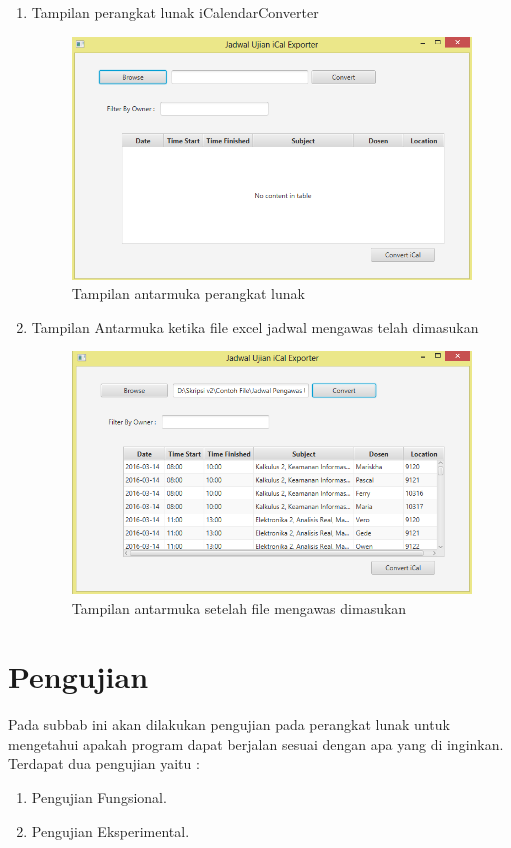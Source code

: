 \begin{enumerate}
	\item Tampilan perangkat lunak iCalendarConverter
		\begin{figure}[H]
		\centering
		\includegraphics[scale=0.7]{Gambar/implementAntarmuka}
		\caption{Tampilan antarmuka perangkat lunak}
		\label{fig:implementAntarmuka}
		\end{figure}
	\item Tampilan Antarmuka ketika file excel jadwal mengawas telah dimasukan
		\begin{figure}[H]
		\centering
		\includegraphics[scale=0.7]{Gambar/implementAntarmuka2}
		\caption{Tampilan antarmuka setelah file mengawas dimasukan}
		\label{fig:implementAntarmuka}
		\end{figure}
\end{enumerate}

\section{Pengujian}
Pada subbab ini akan dilakukan pengujian pada perangkat lunak untuk mengetahui apakah program dapat berjalan sesuai dengan apa yang di inginkan. Terdapat dua pengujian yaitu :
\begin{enumerate}
	\item Pengujian Fungsional.
	\item Pengujian Eksperimental.
\end{enumerate}

